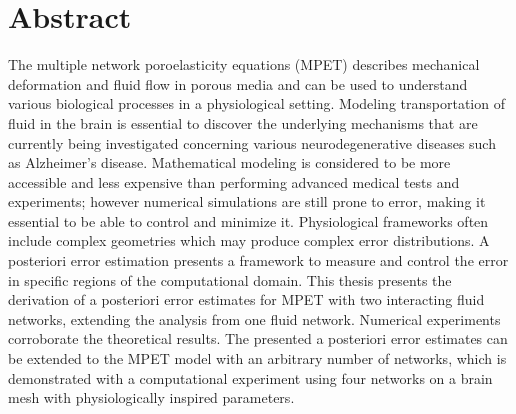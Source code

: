 \chapter{Abstract}

The multiple network poroelasticity equations (MPET) describes mechanical deformation and fluid flow in porous media and can be used to understand various biological processes in a physiological setting. Modeling transportation of fluid in the brain is essential to discover the underlying mechanisms that are currently being investigated concerning various neurodegenerative diseases such as Alzheimer's disease. Mathematical modeling is considered to be more accessible and less expensive than performing advanced medical tests and experiments; however numerical simulations are still prone to error, making it essential to be able to control and minimize it. Physiological frameworks often include complex geometries which may produce complex error distributions. A posteriori error estimation presents a framework to measure and control the error in specific regions of the computational domain. This thesis presents the derivation of a posteriori error estimates for MPET with two interacting fluid networks, extending the analysis from one fluid network. Numerical experiments corroborate the theoretical results. The presented a posteriori error estimates can be extended to the MPET model with an arbitrary number of networks, which is demonstrated with a computational experiment using four networks on a brain mesh with physiologically inspired parameters.

